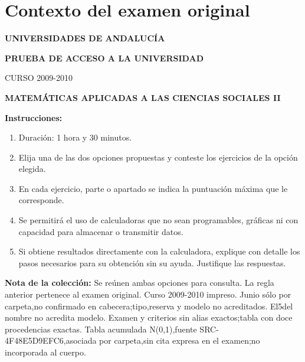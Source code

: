 \section*{Contexto del examen original}
\textbf{UNIVERSIDADES DE ANDALUCÍA}\par
\textbf{PRUEBA DE ACCESO A LA UNIVERSIDAD}\par
CURSO 2009-2010\par
\textbf{MATEMÁTICAS APLICADAS A LAS CIENCIAS SOCIALES II}

\textbf{Instrucciones:}
\begin{enumerate}[label=\textbf{\alph*)}]
  \item Duración: 1 hora y 30 minutos.
  \item Elija una de las dos opciones propuestas y conteste los ejercicios de la opción elegida.
  \item En cada ejercicio, parte o apartado se indica la puntuación máxima que le corresponde.
  \item Se permitirá el uso de calculadoras que no sean programables, gráficas ni con capacidad para almacenar o transmitir datos.
  \item Si obtiene resultados directamente con la calculadora, explique con detalle los pasos necesarios para su obtención sin su ayuda. Justifique las respuestas.
\end{enumerate}
\noindent\textbf{Nota de la colección:} Se reúnen ambas opciones para consulta. La regla anterior pertenece al examen original. Curso 2009-2010 impreso. Junio sólo por carpeta,no confirmado en cabecera;tipo,reserva y modelo no acreditados. El5del nombre no acredita modelo. Examen y criterios sin alias exactos;tabla con doce procedencias exactas. Tabla acumulada N(0,1),fuente SRC-4F48E5D9EFC6,asociada por carpeta,sin cita expresa en el examen;no incorporada al cuerpo.
\par\medskip
